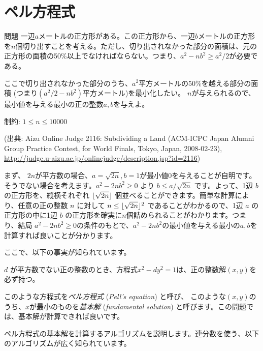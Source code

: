 \documentclass{jsarticle}
\begin{document}
 \section{ペル方程式}
 \label{sec:pells-equation}
 \begin{itembox}[l]{問題}
  一辺$a$メートルの正方形がある。この正方形から、一辺$b$メートルの正方形を$n$個切り出すことを考える。ただし、切り出されなかった部分の面積は、元の正方形の面積の50\%以上でなければならない。つまり、$a^2-nb^2 \ge a^2/2$が必要である。

  ここで切り出されなかった部分のうち、$a^2$平方メートルの50\%を越える部分の面積
  (つまり$(a^2/2-nb^2)$平方メートル)を最小化したい。
  $n$が与えられるので、最小値を与える最小の正の整数$a,b$を与えよ。

  制約: $1 \le n \le 10000$

  (出典: Aizu Online Judge 2116: Subdividing a Land (ACM-ICPC Japan Alumni Group Practice Contest, for World Finals, Tokyo, Japan, 2008-02-23),
  \url{http://judge.u-aizu.ac.jp/onlinejudge/description.jsp?id=2116})
 \end{itembox}
 まず、 $2n$が平方数の場合、$a = \sqrt{2n},b=1$が最小値0を与えることが自明です。
 そうでない場合を考えます。$a^2 -2nb^2 \ge 0$ より $b \le a / \sqrt{2n}$ です。よって、1辺 $b$ の正方形を、縦横それぞれ $\lfloor{\sqrt{2n}}\rfloor$ 個並べることができます。簡単な計算により、任意の正の整数 $n$ に対して $n \le \lfloor{\sqrt{2n}}\rfloor^2$ であることがわかるので、1辺 $a$ の正方形の中に1辺 $b$ の正方形を確実に$n$個詰められることがわかります。つまり、結局 $a^2 - 2nb^2 \ge 0$の条件のもとで、$a^2 - 2nb^2$の最小値を与える最小の$a,b$を計算すれば良いことが分かります。

 ここで、以下の事実が知られています。
 \begin{theorem}
  \label{thm:pells-equation-has-solutions}
  $d$ が平方数でない正の整数のとき、方程式$x^2 - dy^2=1$は、正の整数解$(x,y)$を必ず持つ。
 \end{theorem}
 このような方程式を\emph{ペル方程式} (\emph{Pell's equation}) と呼び、
 このような$(x,y)$のうち、$x$が最小のものを\emph{基本解} (\emph{fundamental solution}) と呼びます。この問題では、基本解が計算できれば良いです。

 ペル方程式の基本解を計算するアルゴリズムを説明します。連分数を使う、以下のアルゴリズムが広く知られています。
\end{document}
